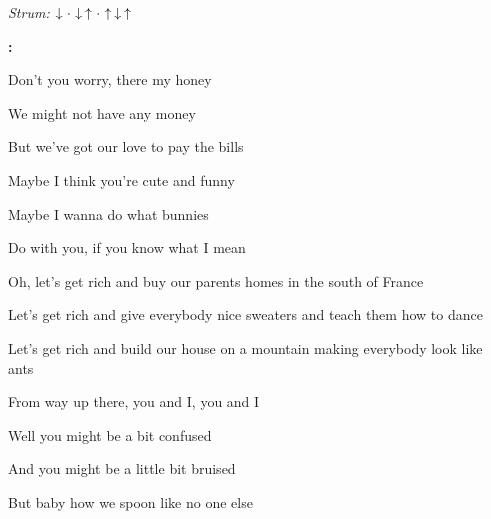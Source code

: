 \begin{song}


\begin{headerbox}
\textit{Strum:} $\Down\Miss\Down\Up\Miss\Up\Down\Up$
\end{headerbox}

\begin{hchordbox}
\end{hchordbox}

\large

\bigskip

\Intro\textbf{:} 

\bigskip

Don't you worry, there my honey \par
{}We might not have any money \par
{}But we've got our love to pay the bills \par

\bigskip

Maybe I think you're cute and funny \par
{}Maybe I wanna do what bunnies \par
{}Do with you, if you know what I mean \par

\bigskip

\begin{chorusboxwide}{\Chorus}
Oh, let's get rich and buy our parents homes in the south of France \par
Let's get rich and give everybody nice sweaters and teach them how to dance \par
Let's get rich and build our house on a mountain making everybody look like ants \par
From way up there, you and I, you and I \par
\end{chorusboxwide}

\bigskip

Well you might be a bit confused \par
And you might be a little bit bruised \par
But baby how we spoon like no one else \par


\end{song}
